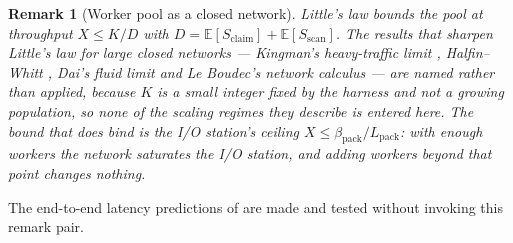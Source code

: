 \documentclass[11pt,letterpaper]{article}
\newtheorem{remark}{Remark}
\begin{document}
\begin{remark}[Worker pool as a closed network]
\label{rem:littl}
Little's law \cite{little1961} bounds the pool at throughput $X\le K/D$ with
$D=\mathbb{E}[S_{\text{claim}}]+\mathbb{E}[S_{\text{scan}}]$. The results that
sharpen Little's law for large closed networks --- Kingman's heavy-traffic
limit \cite{kingman1962}, Halfin--Whitt \cite{halfinwhitt1981}, Dai's fluid
limit \cite{dai1995} and Le Boudec's network calculus \cite{leboudec2001} ---
are named rather than applied, because $K$ is a small integer fixed by the
harness and not a growing population, so none of the scaling regimes they
describe is entered here. The bound that does bind is the I/O station's
ceiling $X\le\beta_{\text{pack}}/L_{\text{pack}}$: with enough workers the
network saturates the I/O station, and adding workers beyond that point
changes nothing.
\end{remark}

The end-to-end latency predictions of  are made and
tested without invoking this remark pair.
\end{document}

